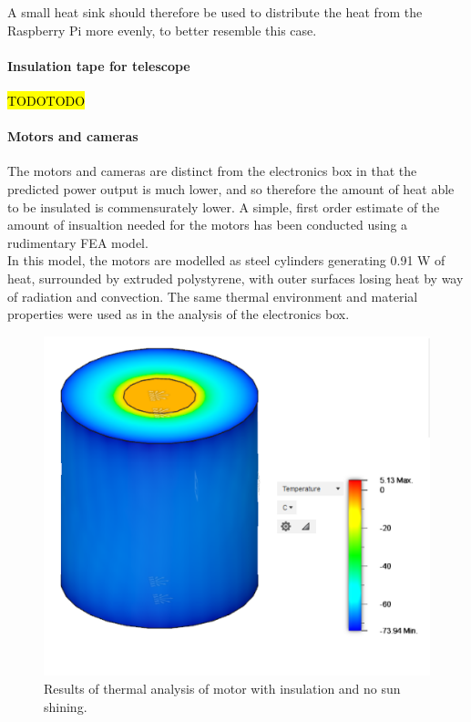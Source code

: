 A small heat sink should therefore be used to distribute the heat from the Raspberry Pi more evenly, to better resemble this case. 

\paragraph{Insulation tape for telescope}
\hl{TODOTODO}


\paragraph{Motors and cameras}
The motors and cameras are distinct from the electronics box in that the predicted power output is much lower, and so therefore the amount of heat able to be insulated is commensurately lower. A simple, first order estimate of the amount of insualtion needed for the motors has been conducted using a rudimentary FEA model.\\

In this model, the motors are modelled as steel cylinders generating 0.91 W of heat, surrounded by extruded polystyrene, with outer surfaces losing heat by way of radiation and convection. The same thermal environment and material properties were used as in the analysis of the electronics box.\\

	\begin{figure}[h!]
    \centering
    \includegraphics[scale=0.6]{4-experiment-design/img/mechanical/thermalmotors.PNG}
	\caption{Results of thermal analysis of motor with insulation and no sun shining.}
	\label{fig:thermalmotors}
	\end{figure}

